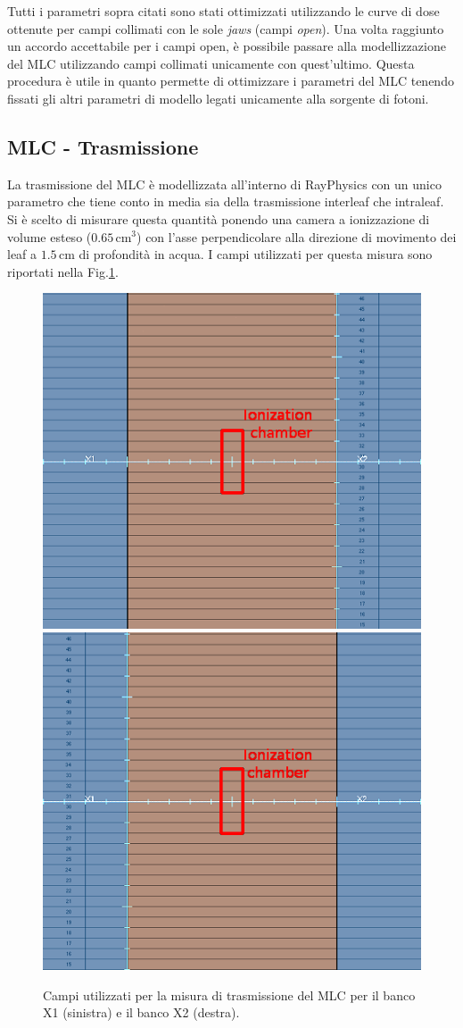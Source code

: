 Tutti i parametri sopra citati sono stati ottimizzati utilizzando le curve di dose ottenute per campi collimati con le sole \textit{jaws} (campi \textit{open}). Una volta raggiunto un accordo accettabile per i campi open, è possibile passare alla modellizzazione del MLC utilizzando campi collimati unicamente con quest'ultimo. Questa procedura è utile in quanto permette di ottimizzare i parametri del MLC tenendo fissati gli altri parametri di modello legati unicamente alla sorgente di fotoni.

\subsection{MLC - Trasmissione}
\label{sec:MLC-trans}
La trasmissione del MLC è modellizzata all'interno di RayPhysics con un unico parametro che tiene conto in media sia della trasmissione interleaf che intraleaf. Si è scelto di misurare questa quantità ponendo una camera a ionizzazione di volume esteso ($0.65\,$cm$^3$) con l'asse perpendicolare alla direzione di movimento dei leaf a $1.5\,$cm di profondità in acqua. I campi utilizzati per questa misura sono riportati nella Fig.\ref{fig:MLC_Trans}. 
\begin{figure}
\centering
\includegraphics[width=.48\textwidth]{./cap2/MLC_TransX1.png}
\includegraphics[width=.48\textwidth]{./cap2/MLC_TransX2.png}
\caption{Campi utilizzati per la misura di trasmissione del MLC per il banco X1 (sinistra) e il banco X2 (destra).}
\label{fig:MLC_Trans}
\end{figure}

